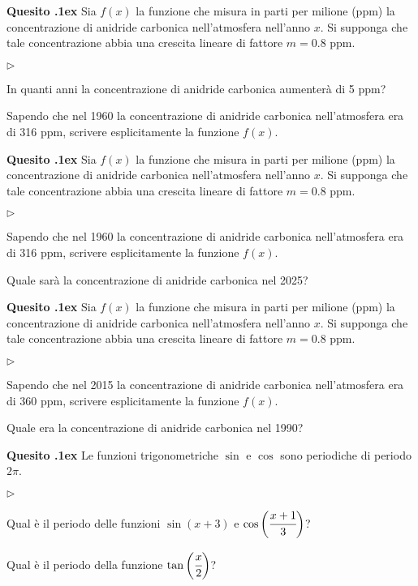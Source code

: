 \documentclass[11pt,twoside,a4paper]{article}
\newcommand{\mylabel}[1]{#1\hfill}
\renewenvironment{itemize}
  {\begin{list}{$\triangleright$}{%
   \setlength{\parskip}{0mm}
   \setlength{\topsep}{.4\baselineskip}
   \setlength{\rightmargin}{0mm}
   \setlength{\listparindent}{0mm}
   \setlength{\itemindent}{0mm}
   \setlength{\labelwidth}{2ex}
   \setlength{\itemsep}{.4\baselineskip}
   \setlength{\parsep}{0mm}
   \setlength{\partopsep}{0mm}
   \setlength{\labelsep}{1ex}
   \setlength{\leftmargin}{\labelwidth+\labelsep}
   \let\makelabel\mylabel}}{%
   \end{list}\vspace*{-1.3mm}}
\newcounter{quesito}
\newenvironment{question}{\bigskip\addtocounter{quesito}{1}\bigskip\bigskip\par\textbf{Quesito \thequesito.\kern1ex}}{\vspace{\parskip}}
\begin{document}
\begin{question}
Sia $f(x)$ la funzione che misura in parti per milione (ppm) la concentrazione di anidride carbonica nell'atmosfera nell'anno $x$. Si supponga che tale concentrazione abbia una crescita lineare di fattore $m = 0.8$ ppm.
\begin{itemize}
\item[1.] In quanti anni la concentrazione di anidride carbonica aumenter\`a di 5 ppm?
\item[2.] Sapendo che nel 1960 la concentrazione di anidride carbonica nell'atmosfera era di 316 ppm, scrivere esplicitamente la funzione $f(x)$.
\end{itemize}
\end{question}

\begin{question}
Sia $f(x)$ la funzione che misura in parti per milione (ppm) la concentrazione di anidride carbonica nell'atmosfera nell'anno $x$. Si supponga che tale concentrazione abbia una crescita lineare di fattore $m = 0.8$ ppm.
\begin{itemize}
\item[1.] Sapendo che nel 1960 la concentrazione di anidride carbonica nell'atmosfera era di 316 ppm, scrivere esplicitamente la funzione $f(x)$.
\item[2.] Quale sar\`a la concentrazione di anidride carbonica nel 2025?
\end{itemize}
\end{question}

\begin{question}
Sia $f(x)$ la funzione che misura in parti per milione (ppm) la concentrazione di anidride carbonica nell'atmosfera nell'anno $x$. Si supponga che tale concentrazione abbia una crescita lineare di fattore $m = 0.8$ ppm.
\begin{itemize}
\item[1.] Sapendo che nel 2015 la concentrazione di anidride carbonica nell'atmosfera era di 360 ppm, scrivere esplicitamente la funzione $f(x)$.
\item[2.] Quale era la concentrazione di anidride carbonica nel 1990?
\end{itemize}
\end{question}

\begin{question}
Le funzioni trigonometriche $\sin$ e $\cos$ sono periodiche di periodo $2 \pi$.
\begin{itemize}
\item[1.] Qual \`e il periodo delle funzioni $\sin \left( x+3 \right)$ e $\cos \bigg( \cfrac{x+1}{3} \bigg)$?
\item[2.] Qual \`e il periodo della funzione $\tan \bigg( \cfrac{x}{2} \bigg)$?
\end{itemize}
\end{question}
\end{document}
